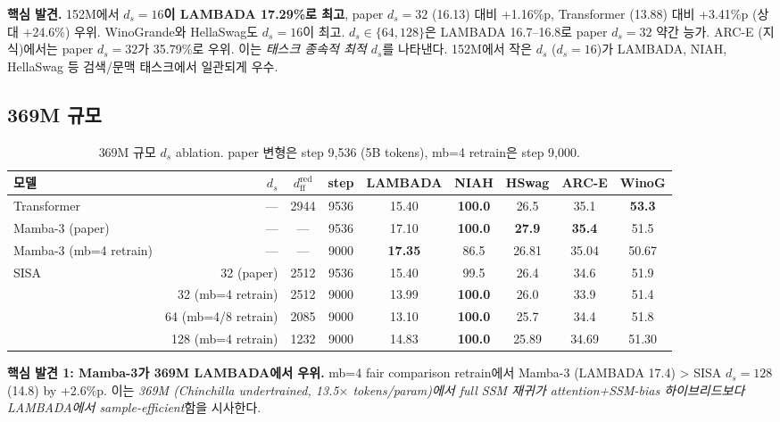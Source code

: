\documentclass[11pt]{article}
\begin{document}
\textbf{핵심 발견.} 152M에서 \textbf{$d_s = 16$이 LAMBADA 17.29\%로 최고}, paper $d_s = 32$ (16.13) 대비 +1.16\%p, Transformer (13.88) 대비 +3.41\%p (상대 +24.6\%) 우위. WinoGrande와 HellaSwag도 $d_s = 16$이 최고. $d_s \in \{64, 128\}$은 LAMBADA 16.7--16.8로 paper $d_s = 32$ 약간 능가. ARC-E (지식)에서는 paper $d_s = 32$가 35.79\%로 우위. 이는 \textit{태스크 종속적 최적 $d_s$}를 나타낸다. 152M에서 작은 $d_s$ ($d_s = 16$)가 LAMBADA, NIAH, HellaSwag 등 검색/문맥 태스크에서 일관되게 우수.

\subsection{369M 규모}

\begin{table}[h]
\centering\small
\caption{369M 규모 $d_s$ ablation. paper 변형은 step 9,536 (5B tokens), mb=4 retrain은 step 9,000.}
\label{tab:ds_369m}
\begin{tabular}{lrccccccc}
\toprule
모델 & $d_s$ & $d_{\text{ff}}^{\text{red}}$ & step & LAMBADA & NIAH & HSwag & ARC-E & WinoG \\
\midrule
Transformer & --- & 2944 & 9536 & 15.40 & \textbf{100.0} & 26.5 & 35.1 & \textbf{53.3} \\
Mamba-3 (paper) & --- & --- & 9536 & 17.10 & \textbf{100.0} & \textbf{27.9} & \textbf{35.4} & 51.5 \\
Mamba-3 (mb=4 retrain) & --- & --- & 9000 & \textbf{17.35} & 86.5 & 26.81 & 35.04 & 50.67 \\
\midrule
\multirow{4}{*}{SISA} & 32 (paper) & 2512 & 9536 & 15.40 & 99.5 & 26.4 & 34.6 & 51.9 \\
 & 32 (mb=4 retrain) & 2512 & 9000 & 13.99 & \textbf{100.0} & 26.0 & 33.9 & 51.4 \\
 & 64 (mb=4/8 retrain) & 2085 & 9000 & 13.10 & \textbf{100.0} & 25.7 & 34.4 & 51.8 \\
 & 128 (mb=4 retrain) & 1232 & 9000 & 14.83 & \textbf{100.0} & 25.89 & 34.69 & 51.30 \\
\bottomrule
\end{tabular}
\end{table}

\textbf{핵심 발견 1: Mamba-3가 369M LAMBADA에서 우위.} mb=4 fair comparison retrain에서 Mamba-3 (LAMBADA 17.4) > SISA $d_s = 128$ (14.8) by +2.6\%p. 이는 \textit{369M (Chinchilla undertrained, 13.5$\times$ tokens/param)에서 full SSM 재귀가 attention+SSM-bias 하이브리드보다 LAMBADA에서 sample-efficient}함을 시사한다.
\end{document}
